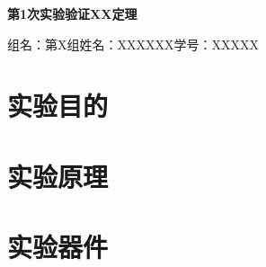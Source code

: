 \documentclass[12pt]{ctexart}
\begin{document}
\thispagestyle{empty}

\begin{center}
    \LARGE\textbf{第1次实验验证XX定理}

    \vspace{1cm}
    组名：第X组\quad 姓名：XXXXXX\quad 学号：XXXXX
\end{center}

\vspace{1cm}


\section{实验目的}


\section{实验原理}


\section{实验器件}

\end{document}
